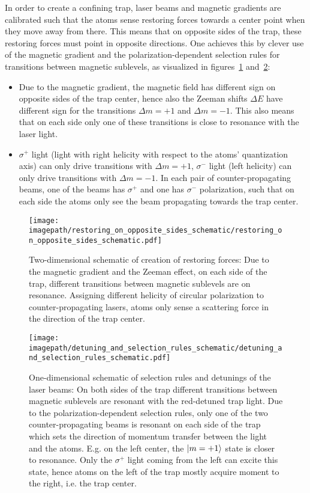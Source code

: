 In order to create a confining trap, laser beams and magnetic gradients are calibrated such that the atoms sense restoring forces towards a center point when they move away from there. This means that on opposite sides of the trap, these restoring forces must point in opposite directions. One achieves this by clever use of the magnetic gradient and the polarization-dependent selection rules for transitions between magnetic sublevels, as visualized in figures~\ref{fig:restoring_on_opposite_sides_schematic} and~\ref{fig:detuning_and_selection_rules_schematic}:
\begin{itemize}
    \item Due to the magnetic gradient, the magnetic field has different sign on opposite sides of the trap center, hence also the Zeeman shifts $\Delta E$ have different sign for the transitions $\Delta m = +1$ and $\Delta m = -1$. This also means that on each side only one of these transitions is close to resonance with the laser light.
    \item $\sigma^+$ light (light with right helicity with respect to the atoms' quantization axis) can only drive transitions with $\Delta m = +1$, $\sigma^-$ light (left helicity) can only drive transitions with $\Delta m = -1$. In each pair of counter-propagating beams, one of the beams has $\sigma^+$ and one has $\sigma^-$ polarization, such that on each side the atoms only see the beam propagating towards the trap center.
\end{itemize}

\begin{figure}
    \centering
    \texttt{[image: \\imagepath/restoring\_on\_opposite\_sides\_schematic/restoring\_on\_opposite\_sides\_schematic.pdf]}
    \caption{Two-dimensional schematic of creation of restoring forces: Due to the magnetic gradient and the Zeeman effect, on each side of the trap, different transitions between magnetic sublevels are on resonance. Assigning different helicity of circular polarization to counter-propagating lasers, atoms only sense a scattering force in the direction of the trap center.}\label{fig:restoring_on_opposite_sides_schematic}
\end{figure} 

\begin{figure}
    \centering
    \texttt{[image: \\imagepath/detuning\_and\_selection\_rules\_schematic/detuning\_and\_selection\_rules\_schematic.pdf]}
    \caption{One-dimensional schematic of selection rules and detunings of the laser beams: On both sides of the trap different transitions between magnetic sublevels are resonant with the red-detuned trap light. Due to the polarization-dependent selection rules, only one of the two counter-propagating beams is resonant on each side of the trap which sets the direction of momentum transfer between the light and the atoms. E.g. on the left center, the $\Ket{m = +1}$ state is closer to resonance. Only the $\sigma^+$ light coming from the left can excite this state, hence atoms on the left of the trap mostly acquire moment to the right, i.e. the trap center.
    }
    \label{fig:detuning_and_selection_rules_schematic}
\end{figure}

